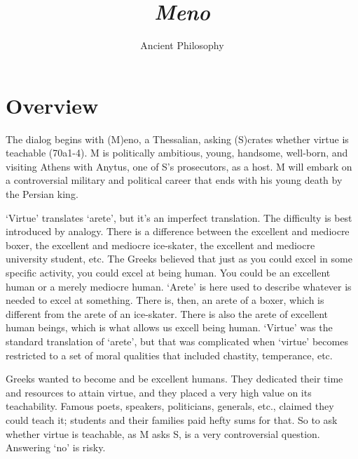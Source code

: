 \documentclass[10 pt]{article}
\begin{document}
\author{Ancient Philosophy}
\title{\emph{Meno}}

\section*{Overview}
The dialog begins with (M)eno, a Thessalian, asking (S)crates whether virtue is teachable (70a1-4). M is politically ambitious, young, handsome, well-born, and visiting Athens with Anytus, one of S's prosecutors, as a host.  M will embark on a controversial military and political career that ends with his young death by the Persian king.  

`Virtue' translates `arete', but it's an imperfect translation. The difficulty is best introduced by analogy. There is a difference between the excellent and mediocre boxer, the excellent and mediocre ice-skater, the excellent and mediocre university student, etc. The Greeks believed that just as you could excel in some specific activity, you could excel at being human. You could be an excellent human or a merely mediocre human. `Arete' is here used to describe whatever is needed to excel at something. There is, then, an arete of a boxer, which is  different from the arete of an ice-skater.  There is also the arete of excellent human beings, which is what allows us excell being human. `Virtue' was the standard translation of `arete', but that was complicated when `virtue' becomes restricted to a set of moral qualities that included chastity, temperance, etc.

Greeks wanted to become and be excellent humans. They dedicated their time and resources to attain virtue, and they placed a very high value on its teachability.  Famous poets, speakers, politicians, generals, etc., claimed they could teach it; students and their families paid hefty sums for that. So to ask whether virtue is teachable, as M asks S, is a very controversial question. Answering `no' is risky.  
\end{document}
